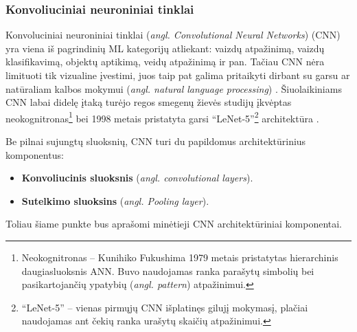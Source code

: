 \documentclass{VUMIFPSbakalaurinis}
\begin{document}
\subsubsection{Konvoliuciniai neuroniniai tinklai}
{
	Konvoluciniai neuroniniai tinklai (\textit{angl. Convolutional Neural Networks}) (CNN) yra viena iš pagrindinių ML kategorijų atliekant: vaizdų atpažinimą, vaizdų klasifikavimą, objektų aptikimą, veidų atpažinimą ir pan. Tačiau CNN nėra limituoti tik vizualine įvestimi, juos taip pat galima pritaikyti dirbant su garsu ar natūraliam kalbos mokymui (\textit{angl. natural language processing}) \cite{cnn_online, handson}. Šiuolaikiniams CNN labai didelę įtaką turėjo regos smegenų žievės studijų įkvėptas neokognitronas\footnote{Neokognitronas -- Kunihiko Fukushima 1979 metais pristatytas hierarchinis daugiasluoksnis ANN. Buvo naudojamas ranka parašytų simbolių bei pasikartojančių ypatybių (\textit{angl. pattern}) atpažinimui.} \cite{fukushima1980neocognitron} bei 1998 metais pristatyta garsi \enquote{LeNet-5}\footnote{\enquote{LeNet-5} -- vienas pirmųjų CNN išplatinęs gilujį mokymasį, plačiai naudojamas ant čekių ranka urašytų skaičių atpažinimui.} architektūra \cite{lecun1998gradient}. \par
	
	Be pilnai sujungtų sluoksnių, CNN turi du papildomus architektūrinius komponentus:
	\begin{itemize}
		\item \textbf{Konvoliucinis sluoksnis} (\textit{angl. convolutional layers}).
		\item \textbf{Sutelkimo sluoksins} (\textit{angl. Pooling layer}).
	\end{itemize}
	Toliau šiame punkte bus aprašomi minėtieji CNN architektūriniai komponentai.
}	
\label{subsubsubsec:convolution_layer}
\end{document}
